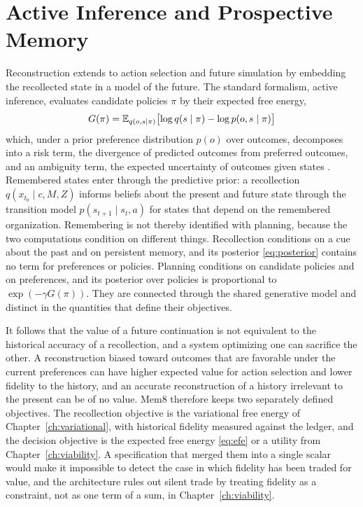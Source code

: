 \chapter{Active Inference and Prospective Memory}\label{ch:active}

Reconstruction extends to action selection and future simulation by embedding the recollected state in a model of the future. The standard formalism, active inference, evaluates candidate policies $\pi$ by their expected free energy,
\begin{equation}\label{eq:efe}
G(\pi)=\mathbb{E}_{q(o,s\mid\pi)}\bigl[\log q(s\mid\pi)-\log p(o,s\mid\pi)\bigr]
\end{equation}
which, under a prior preference distribution $p(o)$ over outcomes, decomposes into a risk term, the divergence of predicted outcomes from preferred outcomes, and an ambiguity term, the expected uncertainty of outcomes given states \cite{friston2017,parr2022}. Remembered states enter through the predictive prior: a recollection $q(x_{t_0}\mid c,M,Z)$ informs beliefs about the present and future state through the transition model $p(s_{t+1}\mid s_t,a)$ for states that depend on the remembered organization. Remembering is not thereby identified with planning, because the two computations condition on different things. Recollection conditions on a cue about the past and on persistent memory, and its posterior \eqref{eq:posterior} contains no term for preferences or policies. Planning conditions on candidate policies and on preferences, and its posterior over policies is proportional to $\exp(-\gamma G(\pi))$. They are connected through the shared generative model and distinct in the quantities that define their objectives.

It follows that the value of a future continuation is not equivalent to the historical accuracy of a recollection, and a system optimizing one can sacrifice the other. A reconstruction biased toward outcomes that are favorable under the current preferences can have higher expected value for action selection and lower fidelity to the history, and an accurate reconstruction of a history irrelevant to the present can be of no value. Mem8 therefore keeps two separately defined objectives. The recollection objective is the variational free energy of Chapter~\ref{ch:variational}, with historical fidelity measured against the ledger, and the decision objective is the expected free energy \eqref{eq:efe} or a utility from Chapter~\ref{ch:viability}. A specification that merged them into a single scalar would make it impossible to detect the case in which fidelity has been traded for value, and the architecture rules out silent trade by treating fidelity as a constraint, not as one term of a sum, in Chapter~\ref{ch:viability}.

